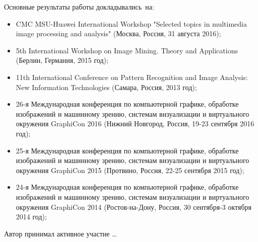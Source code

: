 {\probation}
Основные результаты работы докладывались~на:
\begin{itemize}
	\item CMC MSU-Huawei International Workshop "Selected topics in multimedia image processing and analysis" (Москва, Россия, 31 августа 2016);
	\item 5th International Workshop on Image Mining. Theory and Applications (Берлин, Германия, 2015 год);
	\item 11th International Conference on Pattern Recognition and Image Analysis: New Information Technologies (Самара, Россия, 2013 год);
	\item 26-я Международная конференция по компьютерной графике, обработке изображений и машинному зрению, системам визуализации и виртуального окружения GraphiCon 2016 (Нижний Новгород, Россия, 19-23 сентября 2016 год);
	\item 25-я Международная конференция по компьютерной графике, обработке изображений и машинному зрению, системам визуализации и виртуального окружения GraphiCon 2015 (Протвино, Россия, 22-25 сентября 2015 год);	
	\item 24-я Международная конференция по компьютерной графике, обработке изображений и машинному зрению, системам визуализации и виртуального окружения GraphiCon 2014 (Ростов-на-Дону, Россия, 30 сентября-3 октября 2014 год);
\end{itemize}

{\contribution} Автор принимал активное участие \ldots


